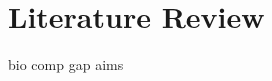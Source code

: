 \documentclass[11pt,a4paper]{report}
\let\LRsection\section
\let\LRsubsection\subsection
\let\LRsubsubsection\subsubsection
\let\LRparagraph\paragraph
\newcommand{\shiftsections}{%
  \let\chapter\LRsection
  \let\section\LRsubsection
  \let\subsection\LRsubsubsection
  \let\subsubsection\LRparagraph
  \let\paragraph\subparagraph}
\begin{document}
\tableofcontents

\chapter{Literature Review}
\label{chap:litreview}

\begingroup
\shiftsections
{bio}
\FloatBarrier
{comp}
\FloatBarrier
{gap}
\FloatBarrier
{aims}
\FloatBarrier
\endgroup

\printbibliography
\end{document}
